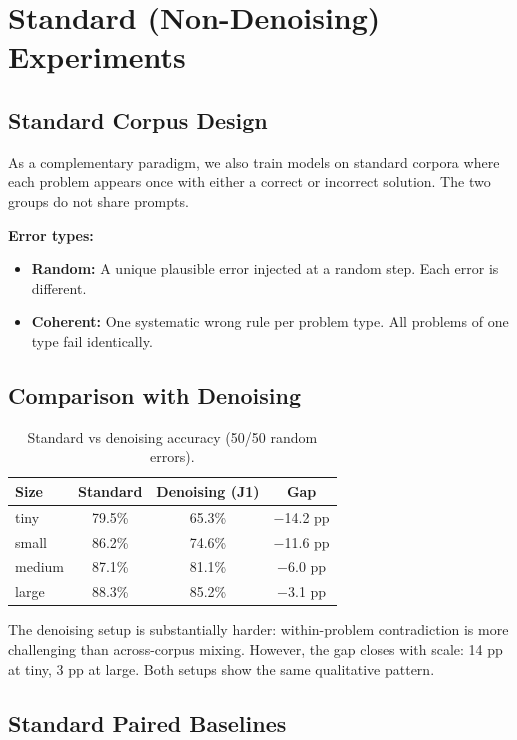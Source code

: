 \documentclass[10pt]{article} %
\begin{document}
\section{Standard (Non-Denoising) Experiments}
\label{app:standard}

\subsection{Standard Corpus Design}

As a complementary paradigm, we also train models on standard corpora where each problem appears once with either a correct or incorrect solution. The two groups do not share prompts.

\textbf{Error types:}
\begin{itemize}
    \item \textbf{Random:} A unique plausible error injected at a random step. Each error is different.
    \item \textbf{Coherent:} One systematic wrong rule per problem type. All problems of one type fail identically.
\end{itemize}

\subsection{Comparison with Denoising}

\begin{table}[t]
\caption{Standard vs denoising accuracy (50/50 random errors).}
\label{tab:std_vs_denoise}
\centering
\begin{tabular}{lccc}
\toprule
Size & Standard & Denoising (J1) & Gap \\
\midrule
tiny & 79.5\% & 65.3\% & $-$14.2 pp \\
small & 86.2\% & 74.6\% & $-$11.6 pp \\
medium & 87.1\% & 81.1\% & $-$6.0 pp \\
large & 88.3\% & 85.2\% & $-$3.1 pp \\
\bottomrule
\end{tabular}
\end{table}

The denoising setup is substantially harder: within-problem contradiction is more challenging than across-corpus mixing. However, the gap closes with scale: 14 pp at tiny, 3 pp at large. Both setups show the same qualitative pattern.

\subsection{Standard Paired Baselines}
\end{document}
